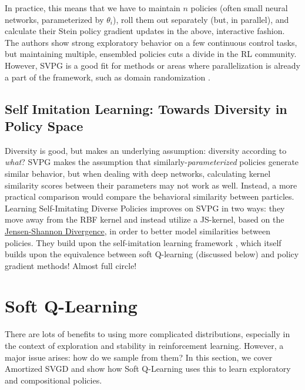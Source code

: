 \documentclass[12pt]{article}
\begin{document}
\noindent In practice, this means that we have to maintain $n$ policies (often small neural networks, parameterized by $\theta_i$), roll them out separately (but, in parallel), and calculate their Stein policy gradient updates in the above, interactive fashion. The authors show strong exploratory behavior on a few continuous control tasks, but maintaining multiple, ensembled policies cuts a divide in the RL community. However, SVPG is a good fit for methods or areas where parallelization is already a part of the framework, such as domain randomization \cite{mehta2019active}. 

\subsection{Self Imitation Learning: Towards Diversity in Policy Space}

Diversity is good, but makes an underlying assumption: diversity according to \textit{what}? SVPG makes the assumption that similarly-\textit{parameterized} policies generate similar behavior, but when dealing with deep networks, calculating kernel similarity scores between their parameters may not work as well. Instead, a more practical comparison would compare the behavioral similarity between particles. Learning Self-Imitating Diverse Policies \cite{gangwani2018learning} improves on SVPG in two ways: they move away from the RBF kernel and instead utilize a JS-kernel, based on the \href{https://en.wikipedia.org/wiki/Jensen\%E2\%80\%93Shannon_divergence}{Jensen-Shannon Divergence}, in order to better model similarities between policies. They build upon the self-imitation learning framework \cite{oh2018selfimitation}, which itself builds upon the equivalence between soft Q-learning \cite{schulman2017equivalence} (discussed below) and policy gradient methods! Almost full circle!

\section{Soft Q-Learning}

\noindent There are lots of benefits to using more complicated distributions, especially in the context of exploration and stability in reinforcement learning. However, a major issue arises: how do we sample from them? In this section, we cover Amortized SVGD \cite{feng2017learning} and show how Soft Q-Learning \cite{haarnoja2017reinforcement} uses this to learn exploratory and compositional policies.
\end{document}

